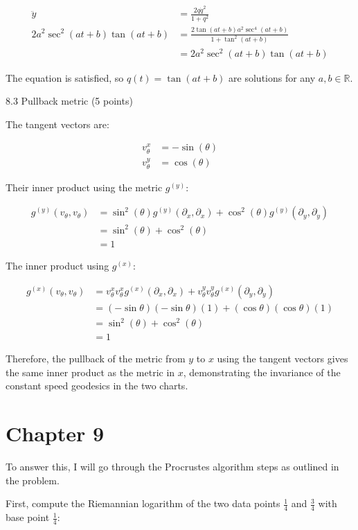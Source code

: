 \documentclass{article}
\begin{document}
\begin{align*}
\ddot{y} &= \frac{2q\dot{q}^2}{1+q^2} \\
2a^2 \sec^2(at+b) \tan(at+b) &= \frac{2\tan(at+b)a^2\sec^4(at+b)}{1+\tan^2(at+b)} \\
&= 2a^2 \sec^2(at+b) \tan(at+b)
\end{align*}

The equation is satisfied, so $q(t) = \tan(at+b)$ are solutions for any $a,b \in \mathbb{R}$.

8.3 Pullback metric (5 points)

The tangent vectors are:

\begin{align*}
v_{\theta}^{x} &= -\sin(\theta) \\
v_{\theta}^{y} &= \cos(\theta) 
\end{align*}

Their inner product using the metric $g^{(y)}$:

\begin{align*}
g^{(y)}(v_{\theta},v_{\theta}) &= \sin^2(\theta) g^{(y)}(\partial_x,\partial_x) + \cos^2(\theta) g^{(y)}(\partial_y,\partial_y) \\
&= \sin^2(\theta) + \cos^2(\theta) \\
&= 1
\end{align*}

The inner product using $g^{(x)}$:

\begin{align*}
g^{(x)}(v_{\theta},v_{\theta}) &= v_{\theta}^{x}v_{\theta}^{x}g^{(x)}(\partial_x,\partial_x) + v_{\theta}^{y}v_{\theta}^{y}g^{(x)}(\partial_y,\partial_y) \\
&= (-\sin\theta)(-\sin\theta)(1) + (\cos\theta)(\cos\theta)(1) \\
&= \sin^2(\theta) + \cos^2(\theta) \\
&= 1
\end{align*}

Therefore, the pullback of the metric from $y$ to $x$ using the tangent vectors gives the same inner product as the metric in $x$, demonstrating the invariance of the constant speed geodesics in the two charts.

\newpage
\section{Chapter 9}
To answer this, I will go through the Procrustes algorithm steps as outlined in the problem.

First, compute the Riemannian logarithm of the two data points $\frac{1}{4}$ and $\frac{3}{4}$ with base point $\frac{1}{4}$:
\end{document}
